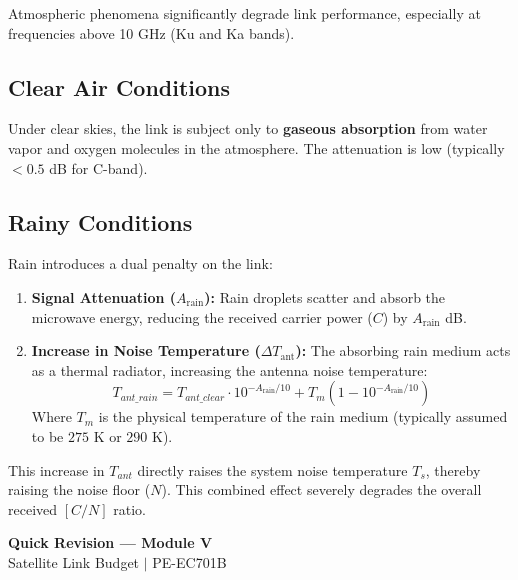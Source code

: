 \documentclass[12pt,a4paper]{article}
\begin{document}
Atmospheric phenomena significantly degrade link performance, especially at frequencies above 10 GHz (Ku and Ka bands).

\subsection{Clear Air Conditions}
Under clear skies, the link is subject only to \textbf{gaseous absorption} from water vapor and oxygen molecules in the atmosphere. The attenuation is low (typically $< 0.5$ dB for C-band).

\subsection{Rainy Conditions}
Rain introduces a dual penalty on the link:
\begin{enumerate}[label=\textbf{\arabic*.}, leftmargin=*, itemsep=3pt]
  \item \textbf{Signal Attenuation ($A_{\text{rain}}$):} Rain droplets scatter and absorb the microwave energy, reducing the received carrier power ($C$) by $A_{\text{rain}}$ dB.
  \item \textbf{Increase in Noise Temperature ($\Delta T_{\text{ant}}$):} The absorbing rain medium acts as a thermal radiator, increasing the antenna noise temperature:
    \begin{equation}
      T_{ant\_rain} = T_{ant\_clear} \cdot 10^{-A_{\text{rain}}/10} + T_m \left( 1 - 10^{-A_{\text{rain}}/10} \right)
    \end{equation}
    Where $T_m$ is the physical temperature of the rain medium (typically assumed to be $275\text{ K}$ or $290\text{ K}$).
\end{enumerate}

This increase in $T_{ant}$ directly raises the system noise temperature $T_s$, thereby raising the noise floor ($N$). This combined effect severely degrades the overall received $[C/N]$ ratio.

\newpage
\begin{center}
  {\large\bfseries\color{myred} Quick Revision --- Module V}\\[3pt]
  {\small\color{mydark} Satellite Link Budget $|$ PE-EC701B}
\end{center}
\noindent{\color{myred}\rule{\linewidth}{1.2pt}}
\vspace{4pt}
\end{document}

